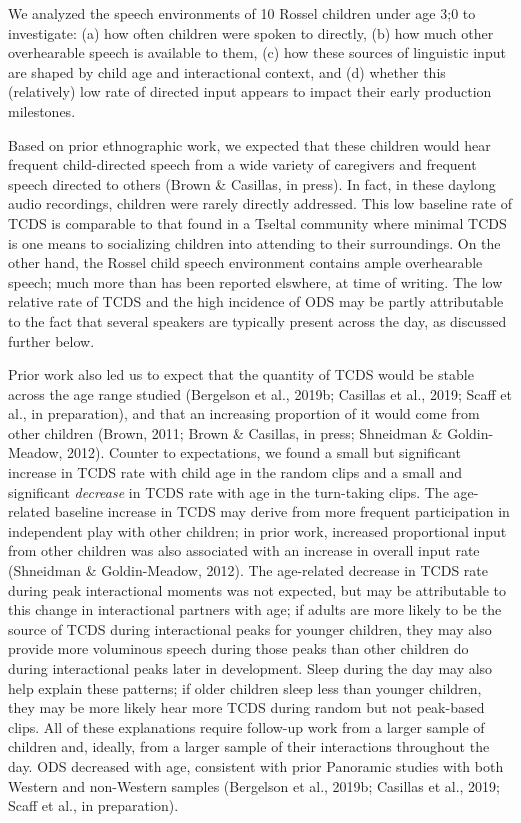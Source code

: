 \documentclass[,man,floatsintext]{apa6}
\begin{document}
We analyzed the speech environments of 10 Rossel children under age 3;0
to investigate: (a) how often children were spoken to directly, (b) how
much other overhearable speech is available to them, (c) how these
sources of linguistic input are shaped by child age and interactional
context, and (d) whether this (relatively) low rate of directed input
appears to impact their early production milestones.

Based on prior ethnographic work, we expected that these children would
hear frequent child-directed speech from a wide variety of caregivers
and frequent speech directed to others (Brown \& Casillas, in press). In
fact, in these daylong audio recordings, children were rarely directly
addressed. This low baseline rate of TCDS is comparable to that found in
a Tseltal community where minimal TCDS is one means to socializing
children into attending to their surroundings. On the other hand, the
Rossel child speech environment contains ample overhearable speech; much
more than has been reported elswhere, at time of writing. The low
relative rate of TCDS and the high incidence of ODS may be partly
attributable to the fact that several speakers are typically present
across the day, as discussed further below.

Prior work also led us to expect that the quantity of TCDS would be
stable across the age range studied (Bergelson et al., 2019b; Casillas
et al., 2019; Scaff et al., in preparation), and that an increasing
proportion of it would come from other children (Brown, 2011; Brown \&
Casillas, in press; Shneidman \& Goldin-Meadow, 2012). Counter to
expectations, we found a small but significant increase in TCDS rate
with child age in the random clips and a small and significant
\emph{decrease} in TCDS rate with age in the turn-taking clips. The
age-related baseline increase in TCDS may derive from more frequent
participation in independent play with other children; in prior work,
increased proportional input from other children was also associated
with an increase in overall input rate (Shneidman \& Goldin-Meadow,
2012). The age-related decrease in TCDS rate during peak interactional
moments was not expected, but may be attributable to this change in
interactional partners with age; if adults are more likely to be the
source of TCDS during interactional peaks for younger children, they may
also provide more voluminous speech during those peaks than other
children do during interactional peaks later in development. Sleep
during the day may also help explain these patterns; if older children
sleep less than younger children, they may be more likely hear more TCDS
during random but not peak-based clips. All of these explanations
require follow-up work from a larger sample of children and, ideally,
from a larger sample of their interactions throughout the day. ODS
decreased with age, consistent with prior Panoramic studies with both
Western and non-Western samples (Bergelson et al., 2019b; Casillas et
al., 2019; Scaff et al., in preparation).
\end{document}
